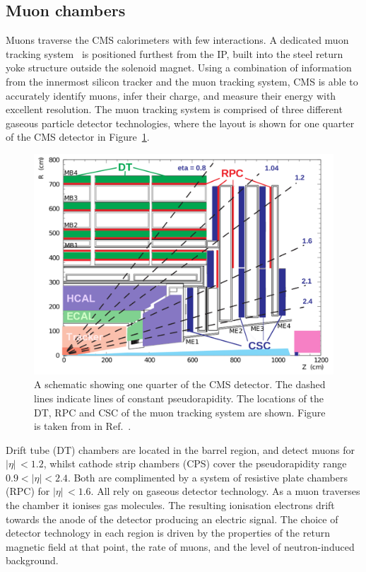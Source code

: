 \subsection{Muon chambers}\label{sec:cms_muon}
Muons traverse the CMS calorimeters with few interactions. A dedicated muon tracking system~\cite{Chatrchyan:2008zzk,Chatrchyan:2013sba} is positioned furthest from the IP, built into the steel return yoke structure outside the solenoid magnet. Using a combination of information from the innermost silicon tracker and the muon tracking system, CMS is able to accurately identify muons, infer their charge, and measure their energy with excellent resolution. The muon tracking system is comprised of three different gaseous particle detector technologies, where the layout is shown for one quarter of the CMS detector in Figure~\ref{fig:cms_muon}. 

\begin{figure}[htb!]
  \centering
  \includegraphics[width=.6\textwidth]{Figures/cms/muon.pdf}
  \caption[The CMS muon chambers]
  {
    A schematic showing one quarter of the CMS detector. The dashed lines indicate lines of constant pseudorapidity. The locations of the DT, RPC and CSC of the muon tracking system are shown. Figure is taken from in Ref.~\cite{Chatrchyan:2012xi}.
  }
  \label{fig:cms_muon}
\end{figure}

Drift tube (DT) chambers are located in the barrel region, and detect muons for ${|\eta|\,<1.2}$, whilst cathode strip chambers (CPS) cover the pseudorapidity range $0.9<|\eta|<2.4$. Both are complimented by a system of resistive plate chambers (RPC) for ${|\eta|\,<1.6}$. All rely on gaseous detector technology. As a muon traverses the chamber it ionises gas molecules. The resulting ionisation electrons drift towards the anode of the detector producing an electric signal. The choice of detector technology in each region is driven by the properties of the return magnetic field at that point, the rate of muons, and the level of neutron-induced background.

